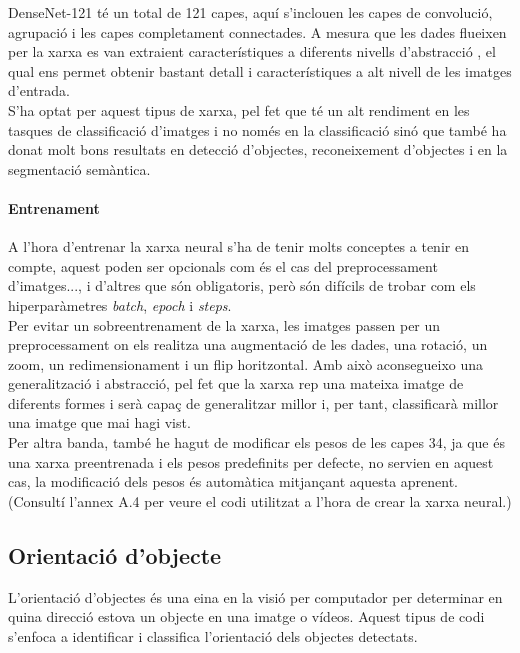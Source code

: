 ﻿\documentclass[10pt,a4paper,twocolumn,twoside]{article}
\begin{document}
DenseNet-121 té un total de 121 capes, aquí s'inclouen les capes de convolució, agrupació i les capes completament connectades. A mesura que les dades flueixen per la xarxa es van extraient característiques a diferents nivells d'abstracció , el qual ens permet obtenir bastant detall i característiques a alt nivell de les imatges d'entrada.
\\

S'ha optat per aquest tipus de xarxa, pel fet que té un alt rendiment en les tasques de classificació d'imatges i no només en la classificació sinó que també ha donat molt bons resultats en detecció d'objectes, reconeixement d'objectes i en la segmentació semàntica.

\paragraph{Entrenament}

A l'hora d'entrenar la xarxa neural s'ha de tenir molts conceptes a tenir en compte, aquest poden ser opcionals com és el cas del preprocessament d'imatges..., i d'altres que són obligatoris, però són difícils de trobar com els hiperparàmetres \textit{batch}, \textit{epoch} i \textit{steps}.
\\

Per evitar un sobreentrenament de la xarxa, les imatges passen per un preprocessament on els realitza una augmentació de les dades, una rotació, un zoom, un redimensionament i un flip horitzontal. Amb això aconsegueixo una generalització i abstracció, pel fet que la xarxa rep una mateixa imatge de diferents formes i serà capaç de generalitzar millor i, per tant, classificarà millor una imatge que mai hagi vist.
\\

Per altra banda, també he hagut de modificar els pesos de les capes 34, ja que és una xarxa preentrenada i els pesos predefinits per defecte, no servien en aquest cas, la modificació dels pesos és automàtica mitjançant aquesta aprenent.
\\
 \hfill \break
(Consultí l’annex A.4 per veure el codi utilitzat a l'hora de crear la xarxa neural.)

 \hfill \break
\subsection{Orientació d'objecte}

L'orientació d'objectes és una eina en la visió per computador per determinar en quina direcció estova un objecte en una imatge o vídeos. Aquest tipus de codi s'enfoca a identificar i classifica l'orientació dels objectes detectats.
\\
\end{document}
